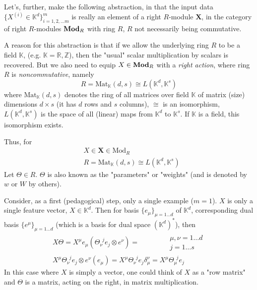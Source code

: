 \documentclass[10pt]{amsart}
\begin{document}
\begin{multicols*}{2}
Let's, further, make the following abstraction, in that the input data $\lbrace X^{(i)} \in \mathbb{K}^d\rbrace^m_{i=1,2,\dots m}$ is really an element of a right $R$-module $\mathbf{X}$, in the category of right $R$-modules $\text{\textbf{Mod}}_R$ with ring $R$, $R$ not necessarily being commutative.  

A reason for this abstraction is that if we allow the underlying ring $R$ to be a field $\mathbb{K}$, (e.g. $\mathbb{K}=\mathbb{R},\mathbb{Z}$), then the "usual" scalar multiplication by scalars is recovered.  But we also need to equip $X\in \text{\textbf{Mod}}_R$ with a \emph{right action}, where ring $R$ is \emph{noncommutative}, namely 
\[
R = \text{Mat}_{\mathbb{K}}(d,s) \cong L(\mathbb{K}^d, \mathbb{K}^s)
\]
where $\text{Mat}_{\mathbb{K}}(d,s)$ denotes the ring of all matrices over field $\mathbb{K}$ of matrix (size) dimensions $d\times s$ (it has $d$ rows and $s$ columns), $\cong$ is an isomorphism, $L(\mathbb{K}^d,\mathbb{K}^s)$ is the space of all (linear) maps from $\mathbb{K}^d$ to $\mathbb{K}^s$.  If $\mathbb{K}$ is a field, this isomorphism exists.  

Thus, for 
\begin{equation}
\begin{aligned}
	& X\in \mathbf{X} \in \text{Mod}_R \\
	&  R = \text{Mat}_{\mathbb{K}}(d,s) \cong L(\mathbb{K}^d,\mathbb{K}^s)
\end{aligned}
\end{equation}
Let $\Theta \in R$. $\Theta$ is also known as the "parameters" or "weights" (and is denoted by $w$ or $W$ by others).  

Consider, as a first (pedagogical) step, only a single example ($m=1$).  $X$ is only a single feature vector, $X\in \mathbb{K}^d$.  Then for basis $\lbrace e_{\mu} \rbrace_{\mu=1\dots d}$ of $\mathbb{K}^d$, corresponding dual basis $\lbrace e^{\mu} \rbrace_{\mu=1\dots d}$ (which is a basis for dual space $(\mathbb{K}^d)^*$), then
\[
\begin{gathered}
	X\Theta = X^{\mu} e_{\mu} ( \Theta^{\, \, \, j}_{  \nu} e_j \otimes e^{\nu}) =  \qquad \quad \, \begin{aligned} & \mu , \nu = 1 \dots d \\ 
&  j = 1\dots s \end{aligned} \\
X^{\mu} \Theta^{\, \, \, j}_{  \nu} e_j \otimes e^{\nu}(e_{\mu})  = X^{\mu} \Theta^{\, \, \, j}_{  \nu} e_j \delta^{\nu}_{\mu} = X^{\mu} \Theta^{\, \, \,  j}_{ \mu} e_j
\end{gathered}
\]
In this case where $X$ is simply a vector, one could think of $X$ as a "row matrix" and $\Theta$ is a matrix, acting on the right, in matrix multiplication.    


\end{multicols*}
\end{document}
